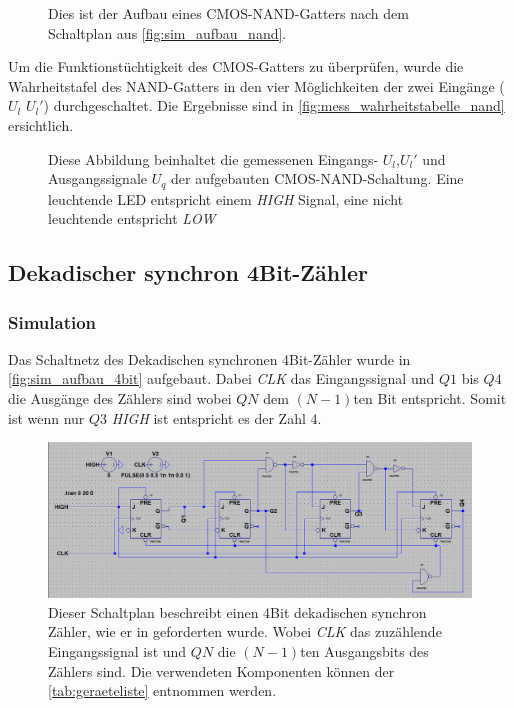 \documentclass[12pt,english,ngerman]{scrartcl}
\begin{document}
\begin{figure}[H]
  \centering
  \caption{Dies ist der Aufbau eines CMOS-NAND-Gatters nach dem Schaltplan aus
  \autoref{fig:sim_aufbau_nand}.}
  \label{fig:mess_aufbau_nand}
\end{figure}

Um die Funktionstüchtigkeit des CMOS-Gatters zu überprüfen, wurde die
Wahrheitstafel des NAND-Gatters in den vier Möglichkeiten der zwei Eingänge ($U_l$ $U_l'$) durchgeschaltet.
Die Ergebnisse sind in \autoref{fig:mess_wahrheitstabelle_nand}
ersichtlich.


\begin{figure}[H]
  \centering
  \caption{Diese Abbildung beinhaltet die gemessenen Eingangs- $U_l$,$U_l'$ und
  Ausgangssignale $U_q$ der aufgebauten CMOS-NAND-Schaltung. Eine leuchtende
  LED entspricht einem \textit{HIGH} Signal, eine nicht leuchtende entspricht
  \textit{LOW}}
  \label{fig:mess_wahrheitstabelle_nand}
\end{figure}


\subsection{Dekadischer synchron 4Bit-Zähler}
\subsubsection{Simulation}

Das Schaltnetz des Dekadischen synchronen 4Bit-Zähler wurde in
\autoref{fig:sim_aufbau_4bit} aufgebaut. Dabei \textit{CLK} das Eingangssignal
und $Q1$ bis $Q4$ die Ausgänge des Zählers sind wobei $QN$ dem $(N-1)$ten Bit
entspricht. Somit ist wenn nur $Q3$ \textit{HIGH} ist entspricht es der Zahl 4.

\begin{figure}[H]
  \centering
    \includegraphics[width=\linewidth]{./figures/sim/4bit/aufbau4bit.png}
    \caption{Dieser Schaltplan beschreibt einen 4Bit dekadischen synchron
      Zähler, wie er in  geforderten wurde. Wobei
      \textit{CLK} das zuzählende Eingangssignal ist und $QN$ die $(N-1)$ten
      Ausgangsbits des Zählers sind. Die verwendeten Komponenten können der
      \autoref{tab:geraeteliste} entnommen werden.}
  \label{fig:sim_aufbau_4bit}
\end{figure}
\end{document}
